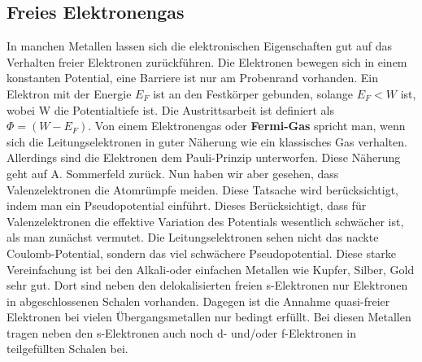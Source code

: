 \documentclass[11pt]{article}
\begin{document}
\subsection{Freies Elektronengas}
In manchen Metallen lassen sich die elektronischen Eigenschaften gut auf das
Verhalten freier Elektronen zurückführen. Die Elektronen bewegen sich in einem
konstanten Potential, eine Barriere ist nur am Probenrand vorhanden. Ein
Elektron mit der Energie $E_F$ ist an den Festkörper gebunden, solange $E_F<W$
ist, wobei W die Potentialtiefe ist. Die Austrittsarbeit ist definiert als
$\Phi=(W-E_F)$. Von einem Elektronengas oder \textbf{Fermi-Gas} spricht man, wenn
sich die Leitungselektronen in guter Näherung wie ein klassisches Gas verhalten.
Allerdings sind die Elektronen dem Pauli-Prinzip unterworfen. Diese Näherung
geht auf A. Sommerfeld zurück. Nun haben wir aber gesehen, dass Valenzelektronen
die Atomrümpfe meiden. Diese Tatsache wird berücksichtigt, indem man ein
Pseudopotential einführt. Dieses Berücksichtigt, dass für Valenzelektronen die
effektive Variation des Potentials wesentlich schwächer ist, als man zunächst
vermutet. Die Leitungselektronen sehen nicht das nackte Coulomb-Potential,
sondern das viel schwächere Pseudopotential. Diese starke Vereinfachung ist bei
den Alkali-oder einfachen Metallen wie Kupfer, Silber, Gold sehr gut. Dort sind
neben den delokalisierten freien s-Elektronen nur Elektronen in abgeschlossenen
Schalen vorhanden. Dagegen ist die Annahme quasi-freier Elektronen bei vielen
Übergangsmetallen nur bedingt erfüllt. Bei diesen Metallen tragen neben den
s-Elektronen auch noch d- und/oder f-Elektronen in teilgefüllten Schalen bei.
\end{document}
